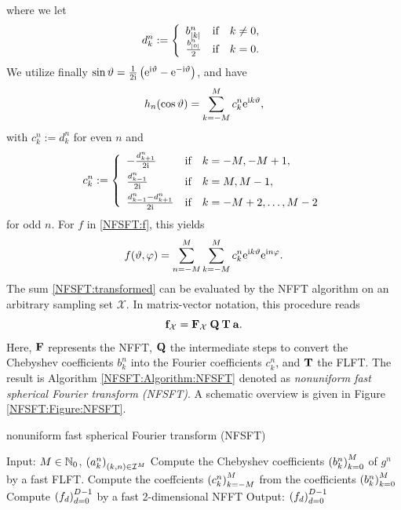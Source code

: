 where we let
\begin{align}
  d_{k}^n :=
    \left\{\begin{array}{l@{\quad \text{if} \quad}l}
      b_{|k|}^n & k \neq 0,\\
      \frac{b_{|0|}^n}{2} & k = 0.
    \end{array}\right. 
\end{align}
We utilize finally $\sin \vartheta = \frac{1}{2\mbox{\scriptsize\rm{i}}} \left(\mbox{\rm{e}}^{\mbox{\scriptsize\rm{i}} \vartheta} - \mbox{\rm{e}}^{-\mbox{\scriptsize\rm{i}} \vartheta}\right)$, and have
\[
  h_{n}{\hspace{-0.4ex}}\left(\cos\vartheta\right) = \sum_{k=-M}^{M} c_{k}^n \mbox{\rm{e}}^{\mbox{\scriptsize\rm{i}} k \vartheta},
\]
with $c_{k}^n := d_{k}^n$ for even $n$ and
\[
  c_{k}^n :=  
  \left\{\begin{array}{l@{\quad \text{if} \quad}l}
    - \frac{d_{k+1}^n}{2\im} & k = -M,-M+1,\\[1ex]
      \frac{d_{k-1}^n}{2\im} & k = M,M-1,\\[1ex]
      \frac{d_{k-1}^n - d_{k+1}^n}{2\im} & k = -M+2,\dots,M-2
  \end{array} \right.
\]
for odd $n$. For $f$ in \eqref{NFSFT:f}, this yields
\begin{equation}
  \label{NFSFT:transformed}
  f{\hspace{-0.4ex}}\left(\vartheta,\varphi\right) = \sum_{n=-M}^{M} \sum_{k=-M}^M c_{k}^n \mbox{\rm{e}}^{\mbox{\scriptsize\rm{i}} k \vartheta} \mbox{\rm{e}}^{\mbox{\scriptsize\rm{i}} n \varphi}.
\end{equation}
The sum \eqref{NFSFT:transformed} can be evaluated by the NFFT algorithm on an arbitrary sampling set $\mathcal{X}$.
In matrix-vector notation, this procedure reads
\begin{equation}
  \label{NFSFT:fastFactorization}
  \mathbf{f}_{\mathcal{X}} = \mathbf{F}_{\mathcal{X}} \: \mathbf{Q} \: \mathbf{T} \: \mathbf{a}.
\end{equation}
Here, $\mathbf{F}$ represents the NFFT, $\mathbf{Q}$ the intermediate steps to convert the Chebyshev coefficients $b_{k}^n$ 
into the Fourier coefficients $c_{k}^n$, and $\mathbf{T}$ the FLFT. The result is Algorithm \ref{NFSFT:Algorithm:NFSFT} denoted as 
\emph{nonuniform fast spherical Fourier transform (NFSFT)}. A schematic overview is given in Figure \ref{NFSFT:Figure:NFSFT}.
\begin{algorithm}[tb]
  \caption{nonuniform fast spherical Fourier transform (NFSFT)}
  \label{NFSFT:Algorithm:NFSFT}    
  \begin{algorithmic}
    \STATE Input:  $M \in \mathbb{N}_{0}$, $\left(a_k^n\right)_{(k,n) \in \mathcal{I}^M}$
      \STATE Compute the Chebyshev coefficients $\left(b_{k}^n\right)_{k=0}^{M}$ of $g^{n}$ by a fast FLFT.
      \STATE Compute the coeffcients $\left(c_{k}^n\right)_{k=-M}^M$ from the coefficients $\left(b_{k}^n\right)_{k=0}^{M}$ 
    \ENDFOR
    \STATE Compute $\left(f_{d}\right)_{d=0}^{D-1}$ by a fast 2-dimensional NFFT
    \STATE Output: $\left(f_{d}\right)_{d=0}^{D-1}$
\end{algorithmic}
\end{algorithm}

